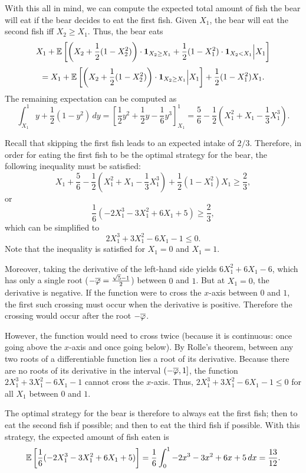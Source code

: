 With this all in mind, we can compute the expected total amount of fish the bear will eat if the bear decides to eat the first fish. Given $X_1$, the bear will eat the second fish iff $X_2 \geq X_1$. Thus, the bear eats 
\[ X_1 + \mathbb{E}\left[ \left(X_2 + \frac{1}{2}(1-X_2^2) \right) \cdot \mathbf{1}_{X_2 \geq X_1} + 
	   \frac{1}{2}(1-X_1^2) \cdot \mathbf{1}_{X_2 < X_1} \Big| X_1 \right] \]
	\[ = X_1 + \mathbb{E}\left[ \left(X_2 + \frac{1}{2}(1-X_2^2) \right) \cdot \mathbf{1}_{X_2 \geq X_1} \Big| X_1 \right] + \frac{1}{2}(1-X_1^2) X_1. \]
The remaining expectation can be computed as 
	\[ \int_{X_1}^1 y + \frac{1}{2}(1-y^2) \, dy = \left[\frac{1}{2}y^2 + \frac{1}{2}y - \frac{1}{6}y^3\right]_{X_1}^1 = \frac{5}{6} - \frac{1}{2}\left( X_1^2 + X_1 - \frac{1}{3} X_1^3 \right). \]

Recall that skipping the first fish leads to an expected intake of $2/3$. Therefore, in order for eating the first fish to be the optimal strategy for the bear, the following inequality must be satisfied:
	\[ X_1 + \frac{5}{6} - \frac{1}{2}\left( X_1^2 + X_1 - \frac{1}{3} X_1^3 \right) + \frac{1}{2}(1-X_1^2) X_1 \geq \frac{2}{3}, \]
or 
	\[ \frac{1}{6}(-2X_1^3 - 3X_1^2 + 6X_1 + 5) \geq \frac{2}{3}, \]
which can be simplified to
	\[ 2X_1^3 + 3X_1^2 - 6X_1 - 1 \leq 0. \]
Note that the inequality is satisfied for $X_1 = 0$ and $X_1 = 1$.

Moreover, taking the derivative of the left-hand side yields $6X_1^2 + 6X_1 - 6$, which has only a single root ($-\overline{\varphi} = \frac{\sqrt{5}-1}{2}$) between $0$ and $1$. But at $X_1 = 0$, the derivative is negative. If the function were to cross the $x$-axis between $0$ and $1$, the first such crossing must occur when the derivative is positive. Therefore the crossing would occur after the root $-\overline{\varphi}$.

However, the function would need to cross twice (because it is continuous: once going above the $x$-axis and once going below). By Rolle's theorem, between any two roots of a differentiable function lies a root of its derivative. Because there are no roots of its derivative in the interval $(-\overline{\varphi},1]$, the function $2X_1^3 + 3X_1^2 - 6X_1 - 1$ cannot cross the $x$-axis. Thus, $2X_1^3 + 3X_1^2 - 6X_1 - 1 \leq 0$ for all $X_1$ between $0$ and $1$.

The optimal strategy for the bear is therefore to always eat the first fish; then to eat the second fish if possible; and then to eat the third fish if possible. With this strategy, the expected amount of fish eaten is 
	\[ \mathbb{E}\left[ \frac{1}{6}(-2X_1^3 - 3X_1^2 + 6X_1 + 5)\right] = \frac{1}{6} \int_0^1 -2x^3 - 3x^2 + 6x + 5 \, dx = \frac{13}{12}. \]

